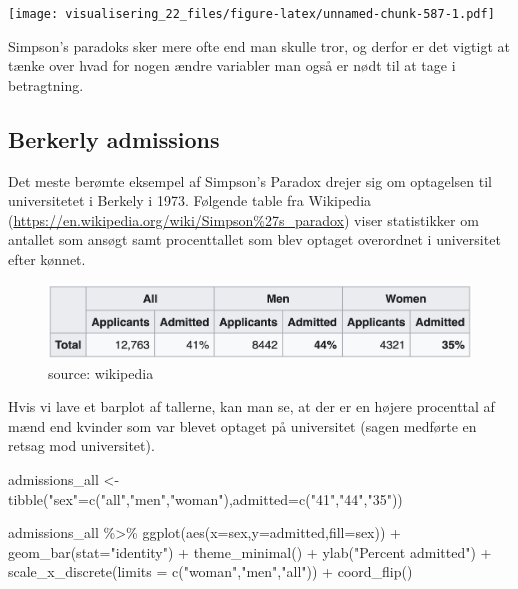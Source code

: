 \documentclass[
]{book}
\newenvironment{Shaded}{\begin{snugshade}}{\end{snugshade}}
\newcommand{\AttributeTok}[1]{\textcolor[rgb]{0.77,0.63,0.00}{#1}}
\newcommand{\FunctionTok}[1]{\textcolor[rgb]{0.00,0.00,0.00}{#1}}
\newcommand{\NormalTok}[1]{#1}
\newcommand{\OtherTok}[1]{\textcolor[rgb]{0.56,0.35,0.01}{#1}}
\newcommand{\SpecialCharTok}[1]{\textcolor[rgb]{0.00,0.00,0.00}{#1}}
\newcommand{\StringTok}[1]{\textcolor[rgb]{0.31,0.60,0.02}{#1}}
\begin{document}
\texttt{[image: visualisering\_22\_files/figure-latex/unnamed-chunk-587-1.pdf]}

Simpson's paradoks sker mere ofte end man skulle tror, og derfor er det vigtigt at tænke over hvad for nogen ændre variabler man også er nødt til at tage i betragtning.

\hypertarget{berkerly-admissions}{%
\subsection{Berkerly admissions}\label{berkerly-admissions}}

Det meste berømte eksempel af Simpson's Paradox drejer sig om optagelsen til universitetet i Berkely i 1973. Følgende table fra Wikipedia (\url{https://en.wikipedia.org/wiki/Simpson\%27s_paradox}) viser statistikker om antallet som ansøgt samt procenttallet som blev optaget overordnet i universitet efter kønnet.

\begin{figure}
\includegraphics[width=0.85\linewidth]{plots/admissions} \caption{source: wikipedia}\label{fig:unnamed-chunk-588}
\end{figure}

Hvis vi lave et barplot af tallerne, kan man se, at der er en højere procenttal af mænd end kvinder som var blevet optaget på universitet (sagen medførte en retsag mod universitet).

\begin{Shaded}
\begin{Highlighting}[]
\NormalTok{admissions\_all }\OtherTok{\textless{}{-}} \FunctionTok{tibble}\NormalTok{(}\StringTok{"sex"}\OtherTok{=}\FunctionTok{c}\NormalTok{(}\StringTok{"all"}\NormalTok{,}\StringTok{"men"}\NormalTok{,}\StringTok{"woman"}\NormalTok{),}\AttributeTok{admitted=}\FunctionTok{c}\NormalTok{(}\StringTok{"41"}\NormalTok{,}\StringTok{"44"}\NormalTok{,}\StringTok{"35"}\NormalTok{))}

\NormalTok{admissions\_all }\SpecialCharTok{\%\textgreater{}\%} \FunctionTok{ggplot}\NormalTok{(}\FunctionTok{aes}\NormalTok{(}\AttributeTok{x=}\NormalTok{sex,}\AttributeTok{y=}\NormalTok{admitted,}\AttributeTok{fill=}\NormalTok{sex)) }\SpecialCharTok{+} 
  \FunctionTok{geom\_bar}\NormalTok{(}\AttributeTok{stat=}\StringTok{"identity"}\NormalTok{) }\SpecialCharTok{+} 
  \FunctionTok{theme\_minimal}\NormalTok{() }\SpecialCharTok{+} 
  \FunctionTok{ylab}\NormalTok{(}\StringTok{"Percent admitted"}\NormalTok{) }\SpecialCharTok{+}
  \FunctionTok{scale\_x\_discrete}\NormalTok{(}\AttributeTok{limits =} \FunctionTok{c}\NormalTok{(}\StringTok{"woman"}\NormalTok{,}\StringTok{"men"}\NormalTok{,}\StringTok{"all"}\NormalTok{)) }\SpecialCharTok{+}
  \FunctionTok{coord\_flip}\NormalTok{()}
\end{Highlighting}
\end{Shaded}
\end{document}
